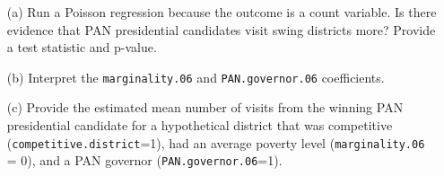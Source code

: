 \documentclass[12pt,letterpaper]{article}
\begin{document}
\begin{enumerate}
	\item [(a)]
	Run a Poisson regression because the outcome is a count variable. Is there evidence that PAN presidential candidates visit swing districts more? Provide a test statistic and p-value.

	\item [(b)]
	Interpret the \texttt{marginality.06} and \texttt{PAN.governor.06} coefficients.
	
	\item [(c)]
	Provide the estimated mean number of visits from the winning PAN presidential candidate for a hypothetical district that was competitive (\texttt{competitive.district}=1), had an average poverty level (\texttt{marginality.06} = 0), and a PAN governor (\texttt{PAN.governor.06}=1).
	
\end{enumerate}
\end{document}
